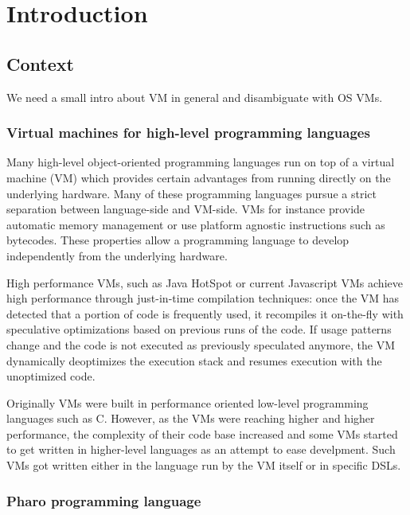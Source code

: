 \documentclass[a4paper,12pt,twoside]{../includes/ThesisStyle}
\begin{document}
\fi

\chapter{Introduction}
\label{chap:intro}
\minitoc

\section{Context}

We need a small intro about VM in general and disambiguate with OS VMs.

\subsection{Virtual machines for high-level programming languages}

Many high-level object-oriented programming languages run on top of a virtual machine (VM) which provides certain advantages from running directly on the underlying hardware. Many of these programming languages pursue a strict separation between language-side and VM-side. VMs for instance provide automatic memory management or use platform agnostic instructions such as bytecodes. These properties allow a programming language to develop independently from the underlying hardware.

High performance VMs, such as Java HotSpot or current Javascript VMs achieve high performance through just-in-time compilation techniques: once the VM has detected that a portion of code is frequently used, it recompiles it on-the-fly with speculative optimizations based on previous runs of the code. If usage patterns change and the code is not executed as previously speculated anymore, the VM dynamically deoptimizes the execution stack and resumes execution with the unoptimized code.

Originally VMs were built in performance oriented low-level programming languages such as C. However, as the VMs were reaching higher and higher performance, the complexity of their code base increased and some VMs started to get written in higher-level languages as an attempt to ease develpment. Such VMs got written either in the language run by the VM itself or in specific DSLs.

\subsection{Pharo programming language}
\end{document}
